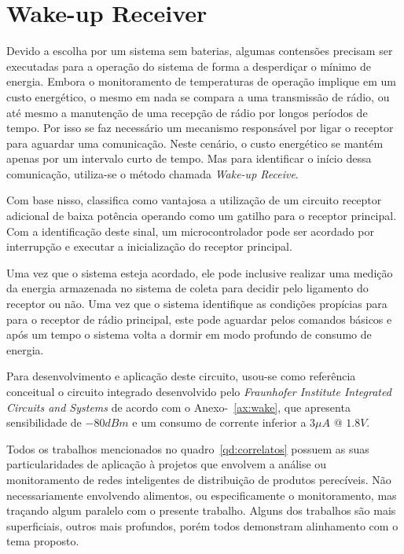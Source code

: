 \section{Wake-up Receiver}
Devido a escolha por um sistema sem baterias, algumas contensões precisam ser executadas para a operação do sistema de forma a desperdiçar o mínimo de energia. Embora o monitoramento de temperaturas de operação implique em um custo energético, o mesmo em nada se compara a uma transmissão de rádio, ou até mesmo a manutenção de uma recepção de rádio por longos períodos de tempo. Por isso se faz necessário um mecanismo responsável por ligar o receptor para aguardar uma comunicação. Neste cenário, o custo energético se mantém apenas por um intervalo curto de tempo. Mas para identificar o início dessa comunicação, utiliza-se o método chamada \textit{Wake-up Receive}. 

Com base nisso,  classifica como vantajosa a utilização de um circuito receptor adicional de baixa potência operando como um gatilho para o receptor principal. Com a identificação deste sinal, um microcontrolador pode ser acordado por interrupção e executar a inicialização do receptor principal.

Uma vez que o sistema esteja acordado, ele pode inclusive realizar uma medição da energia armazenada no sistema de coleta para decidir pelo ligamento do receptor ou não. Uma vez que o sistema identifique as condições propícias para para o receptor de rádio principal, este pode aguardar pelos comandos básicos e após um tempo o sistema volta a dormir em modo profundo de consumo de energia.

Para desenvolvimento e aplicação deste circuito, usou-se como referência conceitual o circuito integrado desenvolvido pelo \textit{Fraunhofer Institute Integrated Circuits and Systems} de acordo com o Anexo-~\ref{ax:wake}, que apresenta sensibilidade de $-80dBm$ e um consumo de corrente inferior a $3\mu A$ @ $1.8V$.



Todos os trabalhos mencionados no quadro~\ref{qd:correlatos} possuem as suas particularidades de aplicação à projetos que envolvem a análise ou monitoramento de redes inteligentes de distribuição de produtos perecíveis. Não necessariamente envolvendo alimentos, ou especificamente o monitoramento, mas traçando algum paralelo com o presente trabalho.
Alguns dos trabalhos são mais superficiais, outros mais profundos, porém todos demonstram alinhamento com o tema proposto.

